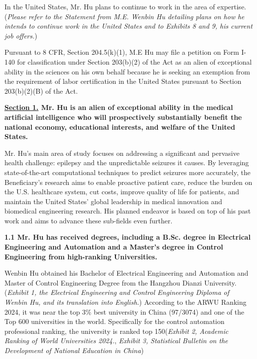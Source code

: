 \documentclass{article}
\begin{document}
In the United States, Mr. Hu plans to continue to work in the area of expertise. ({\it Please refer to the Statement from M.E. Wenbin Hu detailing plans on how he intends to continue work in the United States and to Exhibits 8 and 9, his current job offers.})

Pursuant to 8 CFR, Section 204.5(k)(1), M.E Hu may file a petition on Form I-140 for classification under Section 203(b)(2) of the Act as an alien of exceptional ability in the sciences on his own behalf because he is seeking an exemption from the requirement of labor certification in the United States pursuant to Section 203(b)(2)(B) of the Act.

\clearpage

{\bf \underline{Section 1.} Mr. Hu is an alien of exceptional ability in the medical artificial intelligence who will prospectively substantially benefit the national economy, educational interests, and welfare of the United States.}

Mr. Hu's main area of study focuses on addressing a significant and pervasive health challenge: epilepsy and the unpredictable seizures it causes. By leveraging state-of-the-art computational techniques to predict seizures more accurately, the Beneficiary's research aims to enable proactive patient care, reduce the burden on the U.S. healthcare system, cut costs, improve quality of life for patients, and maintain the United States’ global leadership in medical innovation and biomedical engineering research. His planned endeavor is based on top of his past work and aims to advance these sub-fields even further.

 
{\bf 1.1 Mr. Hu has received degrees, including a B.Sc. degree in Electrical Engineering and Automation and a Master’s degree in Control Engineering  from high-ranking Universities. }

Wenbin Hu obtained his Bachelor of Electrical Engineering and Automation and Master of Control Engineering Degree from the Hangzhou Dianzi University. ({\it Exhibit 1, the Electrical Engineering and Control Engineering Diploma of Wenbin Hu, and its translation into English.}) According to the ARWU Ranking 2024, it was near the top 3\%  best university in China (97/3074) and one of the Top 600 universities in the world. Specifically for the control automation professional ranking, the university is ranked top 150({\it Exhibit 2, Academic Ranking of World Universities 2024.}, {\it Exhibit 3, Statistical Bulletin on the Development of National Education in  China}) 
\end{document}
